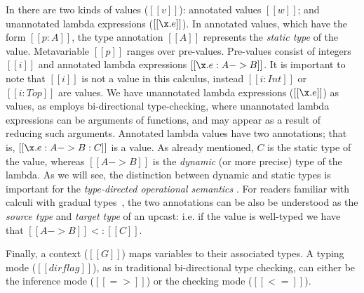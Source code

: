 In \name there are two kinds of values ($[[v]]$): annotated values $[[w]]$; and unannotated
lambda expressions ($[[\x.e]]$). In annotated values, which have the form $[[p
:A]]$, the type annotation $[[A]]$ represents the \textit{static type} of the
value.
Metavariable $[[p]]$ ranges over pre-values. Pre-values
consist of integers $[[i]]$
and annotated lambda expressions $[[\x.e : A -> B]]$.
It is important to note that $[[i]]$ is not a value in this
calculus, instead $[[i:Int]]$ or $[[i:Top]]$ are values.
We have unannotated lambda expressions ($[[\x.e]]$) as values, as
\name employs bi-directional type-checking, where
unannotated lambda expressions can be arguments of functions, and
may appear as a result of reducing such arguments.
Annotated lambda values have two annotations;
that is, $[[\x.e : A -> B : C]]$ is a value.
As already mentioned, $C$ is the static type of the value,
whereas $[[A -> B]]$ is the \emph{dynamic} (or more precise)
type  of the lambda.
As we will see, the distinction between dynamic and static
types is important for the \textit{type-directed operational semantics}
\cite{Huang:typedirected}.
For readers familiar with calculi with gradual types~\cite{Siek06gradualtyping}, the two annotations
can be also be understood as the \emph{source type} and \emph{target type}
of an upcast: i.e. if the value is well-typed we have that $[[A -> B]] <: [[C]]$.

Finally, a context ($[[G]]$) maps variables to their associated types. A typing
mode ($[[dirflag]]$), as in traditional bi-directional type checking, can either be the
inference mode ($[[=>]]$) or the checking mode ($[[<=]]$).


